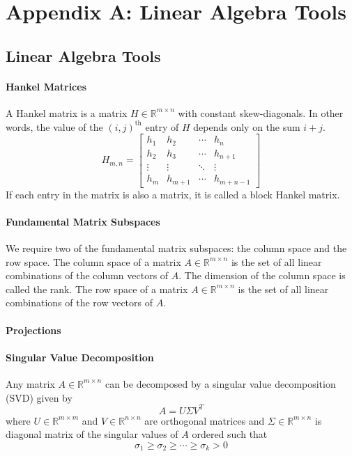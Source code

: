 \chapter*{Appendix A: Linear Algebra Tools}

\section{Linear Algebra Tools}

\subsubsection*{Hankel Matrices}
A Hankel matrix is a matrix $H \in \mathbb{R}^{m\times n}$ with constant skew-diagonals. In other words, the value of the $(i, j)^{\mbox{th}}$ entry of $H$ depends only on the sum $i + j$.
\begin{equation*}
H_{m,n} = \begin{bmatrix}
h_1 & h_2 & \cdots & h_n\\
h_2 & h_3 & \cdots & h_{n+1}\\
\vdots & \vdots & \ddots & \vdots\\
h_m & h_{m+1} & \cdots & h_{m+n-1}
\end{bmatrix}
\end{equation*}
If each entry in the matrix is also a matrix, it is called a block Hankel matrix.


\subsubsection*{Fundamental Matrix Subspaces}
We require two of the fundamental matrix subspaces: the column space and the row space. The column space of a matrix $A \in \mathbb{R}^{m\times n}$ is the set of all linear combinations of the column vectors of $A$. The dimension of the column space is called the rank. The row space of a matrix $A \in \mathbb{R}^{m\times n}$ is the set of all linear combinations of the row vectors of $A$.


\subsubsection*{Projections}


\subsubsection*{Singular Value Decomposition}
Any matrix $A \in \mathbb{R}^{m\times n}$ can be decomposed by a singular value decomposition (SVD) given by
\begin{equation*}
A = U\Sigma V^T
\end{equation*}
where $U \in \mathbb{R}^{m\times m}$ and $V \in \mathbb{R}^{n\times n}$ are orthogonal matrices and $\Sigma \in \mathbb{R}^{m\times n}$ is diagonal matrix of the singular values of $A$ ordered such that
\begin{equation*}
\sigma_1 \geq \sigma_2 \geq \cdots \geq \sigma_k > 0
\end{equation*}
